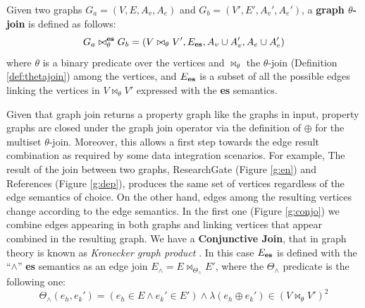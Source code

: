 \begin{definition}\label{def:join}
	\label{def:graphjoin} 
	Given two graphs $G_a=(V,E,A_v,A_e)$ and $G_b=(V',E',A_v',A_e')$, a \textbf{graph
		$\theta$-join} is defined as follows:
	\begin{equation*}
	G_a\bowtie_\theta^{\textbf{\textup{es}}} G_b=(V\bowtie_\theta V',E_{\textup{\textbf{es}}},A_v\cup A_v',A_e\cup A_e')
	\end{equation*}
	where $\theta$ is a binary predicate over the vertices and $\bowtie_\theta$ the $\theta$-join (Definition \ref{def:thetajoin}) among the vertices, and
	$E_{\textup{\textbf{es}}}$ is a subset of all the possible edges linking the vertices in $V\bowtie_\theta V'$ expressed
	with the \textup{\textbf{es}} semantics.
\end{definition}
Given that graph join
returns a property graph like the graphs in input, property graphs are
closed under the graph join operator via the definition of $\oplus$ for the multiset
$\theta$-join. Moreover, this allows a first step towards the edge result combination as required by some data integration scenarios. For example,
The result of the join between two graphs, ResearchGate (Figure \ref{g:en}) and References (Figure \ref{g:dep}), produces the same
set of vertices regardless of the edge semantics of choice. On the other hand, edges among the resulting vertices change according to the edge semantics. In the first one (Figure \ref{g:conjo}) we  combine edges appearing in both graphs
and linking vertices that appear combined in the resulting graph. We have a \textbf{Conjunctive Join}, that in graph theory is known as \textit{Kronecker graph product} \cite{Weichsel,Hammack}.
In this case  $E_{\textup{\textbf{es}}}$ is defined with the ``$\wedge$'' \textbf{es} semantics as an edge join
$E_{\wedge}=E\bowtie_{\Theta_\wedge}E'$, where the ${\Theta_\wedge}$ predicate is the following one:
\begin{equation}
\label{eq:conj}
\Theta_\wedge(e_h,e_k')=(e_h\in E\wedge e_k'\in E') \wedge \lambda(e_h\oplus e_k')\in (V\bowtie_\theta V')^2
\end{equation}




